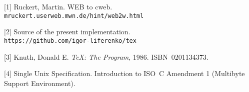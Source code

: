 [1] Ruckert, Martin. WEB to cweb.\\
{\tt mruckert.userweb.mwn.de/hint/web2w.html}

[2] Source of the present implementation.\\
{\tt https://github.com/igor-liferenko/tex}

[3] Knuth, Donald E. {\sl \TeX: The Program\/}, 1986. ISBN~0201134373.

[4] Single Unix Specification. Introduction to ISO~C Amendment 1
(Multibyte Support Environment).

\par\endgroup

\endarticle
